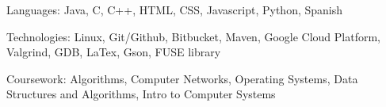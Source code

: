 

\begin{cvskills}


  \cvskill
    {Languages:} %
    {Java, C, C++, HTML, CSS, Javascript, Python, Spanish} %

  \cvskill
    {Technologies:} %
    {Linux, Git/Github, Bitbucket, Maven, Google Cloud Platform, Valgrind, GDB, LaTex, Gson, FUSE library} %

  \cvskill
    {Coursework:} %
    {Algorithms, Computer Networks, Operating Systems, Data Structures and Algorithms, Intro to Computer Systems} %
    
\end{cvskills}
